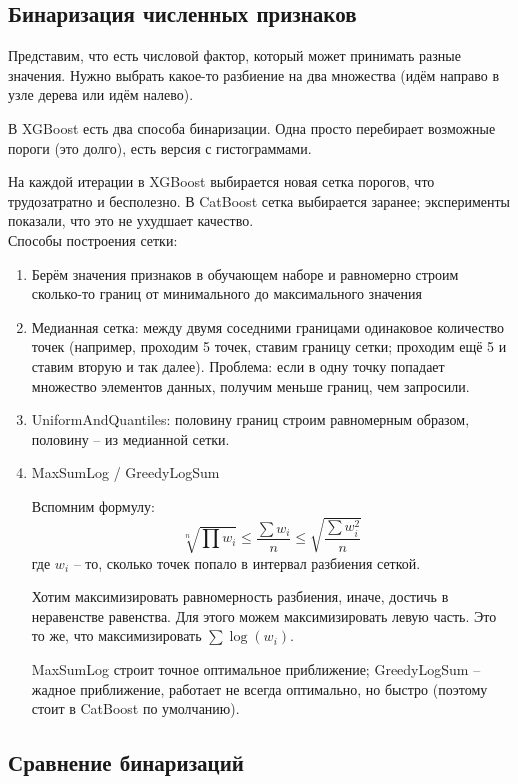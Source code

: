 \documentclass[a4paper,12pt]{article}
\begin{document}
\subsection{Бинаризация численных признаков}

Представим, что есть числовой фактор, который может принимать разные значения.
Нужно выбрать какое-то разбиение на два множества (идём направо в узле дерева или идём налево).

В XGBoost есть два способа бинаризации.
Одна просто перебирает возможные пороги (это долго), есть версия с гистограммами.

На каждой итерации в XGBoost выбирается новая сетка порогов, что трудозатратно и бесполезно.
В CatBoost сетка выбирается заранее; эксперименты показали, что это не ухудшает качество. \\

Способы построения сетки:

\begin{enumerate}[noitemsep]
    \item Берём значения признаков в обучающем наборе и равномерно строим сколько-то границ от минимального до максимального значения
    \item Медианная сетка: между двумя соседними границами одинаковое количество точек (например, проходим 5 точек, ставим границу сетки; проходим ещё 5 и ставим вторую и так далее).
    Проблема: если в одну точку попадает множество элементов данных, получим меньше границ, чем запросили.
    \item UniformAndQuantiles: половину границ строим равномерным образом, половину -- из медианной сетки.
    \item MaxSumLog / GreedyLogSum

    Вспомним формулу:
    $$ \sqrt[n]{\prod w_i} \le \frac{\sum w_i}{n} \le \sqrt{\frac{\sum w_i^2}{n}} $$
    где $w_i$ -- то, сколько точек попало в интервал разбиения сеткой.

    Хотим максимизировать равномерность разбиения, иначе, достичь в неравенстве равенства. Для этого можем максимизировать левую часть.
    Это то же, что максимизировать $ \sum \log(w_i) $.

    MaxSumLog строит точное оптимальное приближение; GreedyLogSum -- жадное приближение, работает не всегда оптимально, но быстро (поэтому стоит в CatBoost по умолчанию).
\end{enumerate}

\subsection{Сравнение бинаризаций}
\end{document}
